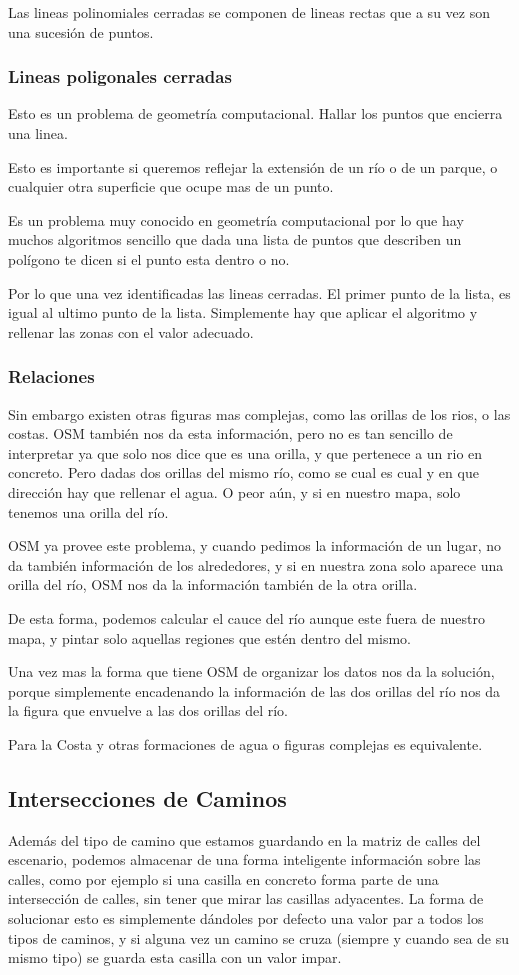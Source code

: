 Las lineas polinomiales cerradas se componen de lineas rectas que a su vez son
una sucesión de puntos.

\subsubsection*{Lineas poligonales cerradas}
Esto es un problema de geometría computacional. Hallar los puntos que encierra
una linea.

Esto es importante si queremos reflejar la extensión de un río o de un parque,
o cualquier otra superficie que ocupe mas de un punto.

Es un problema muy conocido en geometría computacional por lo que hay muchos
algoritmos sencillo que dada una lista de
puntos que describen un polígono te dicen si el punto esta dentro o no.

Por lo que una vez identificadas las lineas cerradas. El primer punto de la
lista, es igual al ultimo punto de la lista. Simplemente hay que aplicar el
algoritmo y rellenar las zonas con el valor adecuado.
\subsubsection*{Relaciones}
Sin embargo existen otras figuras mas complejas, como las orillas de los rios,
o las costas. OSM también nos da esta información, pero no es tan sencillo de
interpretar ya que solo nos dice que es una orilla, y que pertenece a un rio en
concreto.
Pero dadas dos orillas del mismo río, como se cual es cual y en que dirección
hay que rellenar el agua. O peor aún, y si en nuestro mapa, solo tenemos una
orilla del río.

OSM ya provee este problema, y cuando pedimos la información de un lugar, no da
también información de los alrededores, y si en nuestra zona solo aparece una
orilla del río, OSM nos da la información también de la otra orilla.

De esta forma, podemos calcular el cauce del río aunque este fuera de nuestro
mapa, y pintar solo aquellas regiones que estén dentro del mismo.

Una vez mas la forma que tiene OSM de organizar los datos nos da la solución,
porque simplemente encadenando la información de las dos orillas del río nos da
la figura que envuelve a las dos orillas del río.

Para la Costa y otras formaciones de agua o figuras complejas es equivalente.
\subsection*{Intersecciones de Caminos} \label{Intersecciones}
Además del tipo de camino que estamos guardando en la matriz de calles del
escenario, podemos almacenar de una forma inteligente información sobre las
calles, como por ejemplo si una casilla en concreto forma parte de una
intersección de calles, sin tener que mirar las casillas adyacentes. La forma
de solucionar esto es simplemente dándoles por defecto una valor par a todos
los tipos de caminos, y si alguna vez un camino se cruza (siempre y cuando sea
de su mismo tipo) se guarda esta casilla con un valor impar.

